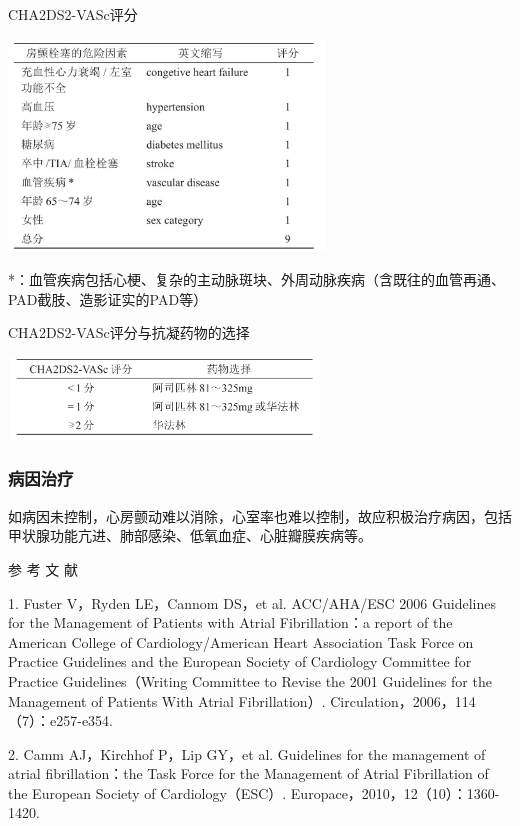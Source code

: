 \begin{table}[htbp]
\centering
\caption{CHA2DS2-VASc评分}
\label{tab102-8}
\includegraphics[width=3.3125in,height=2.21875in]{./images/Image00438.jpg}
\end{table}

*：血管疾病包括心梗、复杂的主动脉斑块、外周动脉疾病（含既往的血管再通、PAD截肢、造影证实的PAD等）

\begin{table}[htbp]
\centering
\caption{CHA2DS2-VASc评分与抗凝药物的选择}
\label{tab102-9}
\includegraphics[width=3.26042in,height=0.86458in]{./images/Image00439.jpg}
\end{table}

\subsubsection{病因治疗}

如病因未控制，心房颤动难以消除，心室率也难以控制，故应积极治疗病因，包括甲状腺功能亢进、肺部感染、低氧血症、心脏瓣膜疾病等。

\hypertarget{text00291.htmlux5cux23CHP10-2-4-4}{}
参 考 文 献

1. Fuster V，Ryden LE，Cannom DS，et al. ACC/AHA/ESC 2006 Guidelines for
the Management of Patients with Atrial Fibrillation：a report of the
American College of Cardiology/American Heart Association Task Force on
Practice Guidelines and the European Society of Cardiology Committee for
Practice Guidelines（Writing Committee to Revise the 2001 Guidelines for
the Management of Patients With Atrial Fibrillation）.
Circulation，2006，114（7）：e257-e354.

2. Camm AJ，Kirchhof P，Lip GY，et al. Guidelines for the management of
atrial fibrillation：the Task Force for the Management of Atrial
Fibrillation of the European Society of Cardiology（ESC）.
Europace，2010，12（10）：1360-1420.

